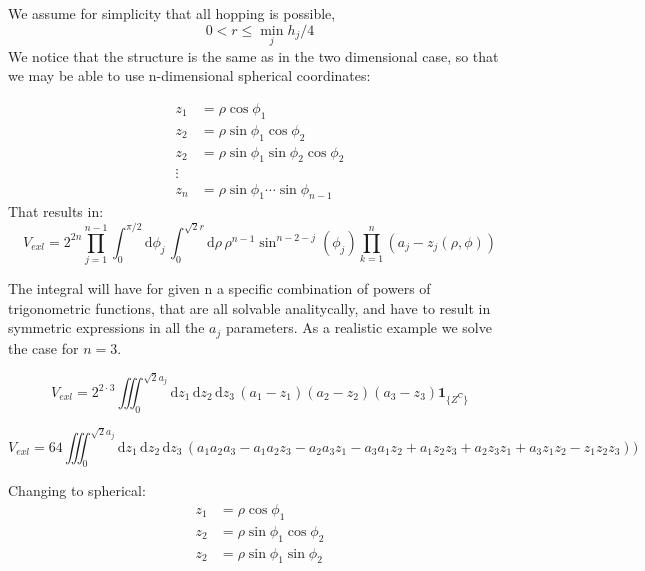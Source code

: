 \documentclass[superscriptaddress,pre,reprint,showpacs,onecolumn]{revtex4-1}
\newcommand{\rd}[1]{\mathrm{d}{#1} \,}
\newcommand{\indicatorsymbol}{\mathbf{1}}
\newcommand{\indicator}[1]{\indicatorsymbol_{ \{   #1 \} } }
\begin{document}
We assume for simplicity that all hopping is possible,
\begin{equation}
  0 < r \leq \min_j {h_j/4}
\end{equation}
We notice that the structure is the same as in the two dimensional case,
so that we may be able to use n-dimensional spherical coordinates:

\begin{equation}
  \begin{split}
    z_1 & =\rho \cos \phi_1 \\
    z_2 & =\rho \sin \phi_1 \cos \phi_2 \\
     z_2 & =\rho \sin \phi_1 \sin \phi_2 \cos \phi_2 \\
    \vdots & \\
    z_n & = \rho \sin \phi_1 \cdots \sin \phi_{n-1}
  \end{split}
\end{equation}
That results in:
\begin{equation}
  V_{exl}=2^{2n} \prod_{j=1}^{n-1} \int_0^{\pi/2} \rd{\phi_j}
  \int_0^{\sqrt{2}r} \rd{\rho} \rho^{n-1} \sin^{n-2-j}(\phi_j)
  \prod_{k=1}^n (a_j -z_j(\rho, \phi)) 
\end{equation}

The integral will have for given n a specific combination of powers
of trigonometric functions, that are all solvable analitycally, and have
to result in symmetric expressions in all the $a_j$ parameters. As
a realistic example we solve the case for $n=3$.

\begin{equation}
  V_{exl}=2^{2\cdot 3} \iiint_0^ {\sqrt{2} a_j} \rd{z_1} \rd{z_2}  \rd{z_3} 
  (a_1 -z_1)(a_2 -z_2)(a_3-z_3) \indicator{Z^Ĉ}
\end{equation}

\begin{equation}
  V_{exl} = 64 \iiint_0^ {\sqrt{2} a_j} \rd{z_1} \rd{z_2}  \rd{z_3} 
  (a_1 a_2 a_3 -a_1 a_2 z_3 -a_2 a_3 z_1 -a_3 a_1 z_2
   +a_1 z_2 z_3+a_2 z_3 z_1+a_3 z_1 z_2
   -z_1 z _2 z_3 )
  )
\end{equation}

Changing to spherical:
\begin{equation}
  \begin{split}
    z_1 & =\rho \cos \phi_1 \\
    z_2 & =\rho \sin \phi_1 \cos \phi_2 \\
     z_2 & =\rho \sin \phi_1 \sin \phi_2 
  \end{split}
\end{equation}
\end{document}
